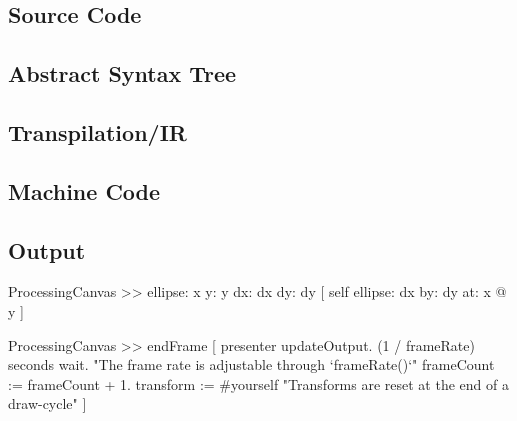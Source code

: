 \subsection{Source Code}
\subsection{Abstract Syntax Tree}
\subsection{Transpilation/IR}
\subsection{Machine Code}
\subsection{Output}


\begin{code}
ProcessingCanvas >> ellipse: x y: y dx: dx dy: dy [
	self
		ellipse: dx
		by: dy
		at: x @ y
]
\end{code}


\begin{code}
ProcessingCanvas >> endFrame [
	presenter updateOutput.
	(1 / frameRate) seconds wait.	"The frame rate is adjustable through `frameRate()`"
	frameCount := frameCount + 1.
	transform := #yourself	"Transforms are reset at the end of a draw-cycle"
]
\end{code}
